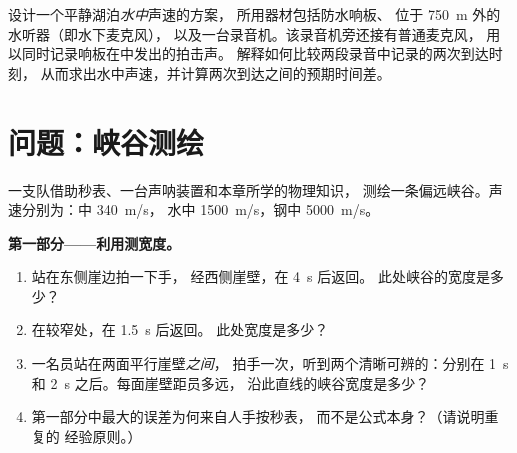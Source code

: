 \begin{exercise}[$\star\star\star$]\label{exo:g7:sound-production:12}
设计一个平静湖泊\emph{水中}声速的方案，
所用器材包括防水响板、
位于 \qty{750}{m} 外的水听器（即水下麦克风），
以及一台录音机。该录音机旁还接有普通麦克风，
用以同时记录响板在中发出的拍击声。
解释如何比较两段录音中记录的两次到达时刻，
从而求出水中声速，并计算两次到达之间的预期时间差。
\end{exercise}

\section{问题：峡谷测绘}

\begin{problem}\label{pb:g7:sound-production:1}
一支队借助秒表、一台声呐装置和本章所学的物理知识，
测绘一条偏远峡谷。声速分别为：中 \qty{340}{m/s}，
水中 \qty{1500}{m/s}，钢中 \qty{5000}{m/s}。

\medskip\noindent\textbf{第一部分——利用测宽度。}
\begin{enumerate}
  \item 站在东侧崖边拍一下手，
        经西侧崖壁，在 \qty{4}{s} 后返回。
        此处峡谷的宽度是多少？
  \item 在较窄处，在 \qty{1.5}{s} 后返回。
        此处宽度是多少？
  \item 一名员站在两面平行崖壁\emph{之间}，
        拍手一次，听到两个清晰可辨的：分别在
        \qty{1}{s} 和 \qty{2}{s} 之后。每面崖壁距员多远，
        沿此直线的峡谷宽度是多少？
  \item 第一部分中最大的误差为何来自人手按秒表，
        而不是公式本身？（请说明重复的
        经验原则。）
\end{enumerate}


\end{problem}

